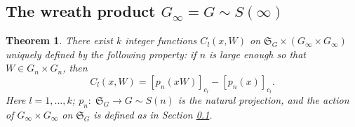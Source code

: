 \documentclass[10pt,a4paper]{amsart}
\newtheorem{thm}{Theorem}
\begin{document}
\subsection{The wreath product $G_{\infty}=G\sim S(\infty)$}\label{SubSectionWreathInfty}

\begin{thm}\label{THEOREMCocycles} There exist $k$ integer functions $C_{l}\left(x,W\right)$ on $\mathfrak{S}_{G}\times\left(G_{\infty}\times G_{\infty}\right)$ uniquely defined by the following property:
if $n$ is large enough so that $W\in G_n\times G_n$, then
\begin{equation}\label{Cocycles}
C_l\left(x,W\right)=\left[p_n\left(xW\right)\right]_{c_l}-\left[p_n(x)\right]_{c_l}.
\end{equation}
Here $l=1,\ldots,k$;  $p_n :\;\mathfrak{S}_G\longrightarrow G\sim S(n)$ is the natural projection, and the action of $G_{\infty}\times G_{\infty}$ on $\mathfrak{S}_{G}$ is defined as in Section \ref{SubSectionWreathInfty}.
\end{thm}
\end{document}
